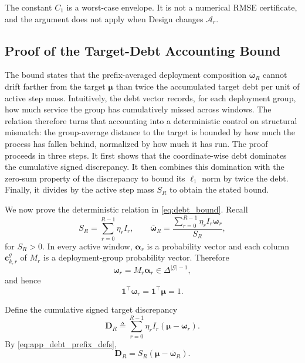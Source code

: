 The constant $C_1$ is a worst-case envelope.  It is not a numerical
RMSE certificate, and the argument does not apply when Design changes
$\mathcal{A}_r$.


\subsection{Proof of the Target-Debt Accounting Bound}
\label{app:proof_debt_bound}

The bound states that the prefix-averaged deployment composition
$\overline{\boldsymbol\omega}_R$ cannot drift farther from the target
$\boldsymbol\mu$ than twice the accumulated target debt per unit of active
step mass.  Intuitively, the debt vector records, for each deployment group,
how much service the group has cumulatively missed across windows.  The
relation therefore turns that accounting into a deterministic control on
structural mismatch: the group-average distance to the target is bounded by
how much the process has fallen behind, normalized by how much it has run.
The proof proceeds in three steps.  It first shows that the coordinate-wise
debt dominates the cumulative signed discrepancy.  It then combines this
domination with the zero-sum property of the discrepancy to bound its
$\ell_1$ norm by twice the debt.  Finally, it divides by the active step
mass $S_R$ to obtain the stated bound.

We now prove the deterministic relation in
\eqref{eq:debt_bound}.  Recall
\begin{equation}
    S_R
    =
    \sum_{r=0}^{R-1}\eta_rI_r,
    \qquad
    \overline{\boldsymbol\omega}_R
    =
    \frac{
    \sum_{r=0}^{R-1}
    \eta_rI_r\boldsymbol\omega_r
    }{S_R},
    \label{eq:app_debt_prefix_defs}
\end{equation}
for $S_R>0$.  In every active window,
$\boldsymbol\alpha_r$ is a probability vector and each column
$\mathbf{c}_{k,r}^{g}$ of $M_r$ is a deployment-group probability vector.
Therefore
\begin{equation}
    \boldsymbol\omega_r
    =
    M_r\boldsymbol\alpha_r
    \in
    \Delta^{|\mathcal G|-1},
    \label{eq:app_omega_simplex}
\end{equation}
and hence
\begin{equation}
    \mathbf{1}^{\top}\boldsymbol\omega_r
    =
    \mathbf{1}^{\top}\boldsymbol\mu
    =1.
    \label{eq:app_equal_mass}
\end{equation}

Define the cumulative signed target discrepancy
\begin{equation}
    \mathbf{D}_R
    \triangleq
    \sum_{r=0}^{R-1}
    \eta_rI_r
    \left(
    \boldsymbol\mu-\boldsymbol\omega_r
    \right).
    \label{eq:app_DR}
\end{equation}
By \eqref{eq:app_debt_prefix_defs},
\begin{equation}
    \mathbf{D}_R
    =
    S_R
    \left(
    \boldsymbol\mu-\overline{\boldsymbol\omega}_R
    \right).
    \label{eq:app_DR_baromega}
\end{equation}

